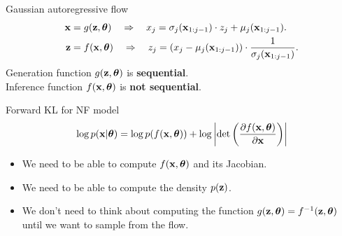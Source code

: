 \begin{frame}{Gaussian autoregressive flow}
	\vspace{-0.2cm}
	\begin{align*}
		\mathbf{x} &= g(\mathbf{z}, \boldsymbol{\theta}) \quad \Rightarrow \quad x_j = \sigma_j (\mathbf{x}_{1:j-1}) \cdot z_j + \mu_j(\mathbf{x}_{1:j-1}). \\
		\mathbf{z} &= f(\mathbf{x}, \boldsymbol{\theta}) \quad \Rightarrow \quad z_j = \left(x_j - \mu_j(\mathbf{x}_{1:j-1}) \right) \cdot \frac{1}{ \sigma_j (\mathbf{x}_{1:j-1})}.
	\end{align*}
	Generation function $g(\mathbf{z}, \boldsymbol{\theta})$ is \textbf{sequential}. \\ Inference function $f(\mathbf{x}, \boldsymbol{\theta})$ is \textbf{not sequential}.
	\begin{block}{Forward KL for NF model}
		\vspace{-0.2cm}
		\[
		\log p(\mathbf{x}|\boldsymbol{\theta}) = \log p(f(\mathbf{x}, \boldsymbol{\theta})) + \log  \left|\det \left( \frac{\partial f(\mathbf{x}, \boldsymbol{\theta})}{\partial \mathbf{x}} \right) \right|
		\]
		\vspace{-0.2cm}
		\begin{itemize}
			\item We need to be able to compute $f(\mathbf{x}, \boldsymbol{\theta})$ and its Jacobian.
			\item We need to be able to compute the density $p(\mathbf{z})$.
			\item We don’t need to think about computing the function $g(\mathbf{z}, \boldsymbol{\theta}) = f^{-1}(\mathbf{z}, \boldsymbol{\theta})$ until we want to sample from the flow.
		\end{itemize}
	\end{block}
\end{frame}
